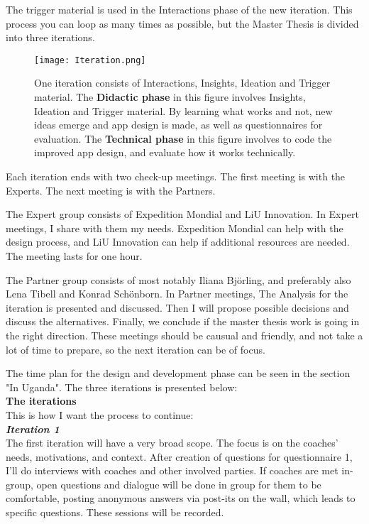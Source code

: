 The trigger material is used in the Interactions phase of the new iteration. This process you can loop as many times as possible, but the Master Thesis is divided into three iterations.

\begin{figure}[h]
    \centering
    \texttt{[image: Iteration.png]}
    \caption{One iteration consists of Interactions, Insights, Ideation and Trigger material. The \textbf{Didactic phase} in this figure involves Insights, Ideation and Trigger material. By learning what works and not, new ideas emerge and app design is made, as well as questionnaires for evaluation. The \textbf{Technical phase} in this figure involves to code the improved app design, and evaluate how it works technically.}
    \label{fig:iteration}
\end{figure}

Each iteration ends with two check-up meetings. The first meeting is with the Experts. The next meeting is with the Partners.

The Expert group consists of Expedition Mondial and LiU Innovation. In Expert meetings, I share with them my needs. Expedition Mondial can help with the design process, and LiU Innovation can help if additional resources are needed. The meeting lasts for one hour.

The Partner group consists of most notably Iliana Björling, and preferably also Lena Tibell and Konrad Schönborn. In Partner meetings, The Analysis for the iteration is presented and discussed. Then I will propose possible decisions and discuss the alternatives. %
Finally, we conclude if the master thesis work is going in the right direction. These meetings should be causual and friendly, and not take a lot of time to prepare, so the next iteration can be of focus. %

The time plan for the design and development phase can be seen in the section "In Uganda". The three iterations is presented below: \\

\textbf{The iterations} \\
This is how I want the process to continue:\\

	\textit{\textbf{Iteration 1}}\\
    The first iteration will have a very broad scope. The focus is on the coaches' needs, motivations, and context.  After creation of questions for questionnaire 1, I'll do interviews with coaches and other involved parties. If coaches are met in-group, open questions and dialogue will be done in group for them to be comfortable, posting anonymous answers via post-its on the wall, which leads to specific questions. These sessions will be recorded.
    
